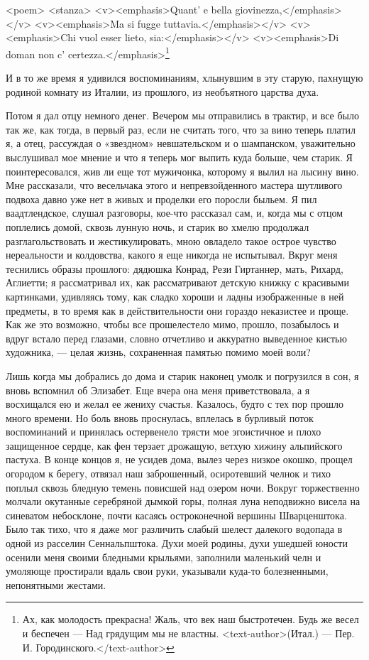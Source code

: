 <poem> <stanza> <v><emphasis>Quant’ e bella giovinezza,</emphasis></v>
<v><emphasis>Ma  si  fugge  tuttavia.</emphasis></v>  <v><emphasis>Chi
vuol  esser lieto,  sia:</emphasis></v> <v><emphasis>Di  doman non  c’
certezza.</emphasis>\footnote{Ах, как  молодость прекрасна!  Жаль, что
век наш  быстротечен. Будь же  весел и беспечен  — Над грядущим  мы не
властны. <text-author>(Итал.) --- Пер. И. Городинского.</text-author>}

И в  то же  время я  удивился воспоминаниям,  хлынувшим в  эту старую,
пахнущую  родиной  комнату  из  Италии, из  прошлого,  из  необъятного
царства духа.

Потом  я дал  отцу немного  денег. Вечером  мы отправились  в трактир,
и  все  было  так  же,  как  тогда, в  первый  раз,  если  не  считать
того, что  за вино  теперь платил  я, а  отец, рассуждая  о «звездном»
невшательском и о шампанском, уважительно  выслушивал мое мнение и что
я  теперь  мог выпить  куда  больше,  чем старик.  Я  поинтересовался,
жив  ли еще  тот  мужичонка,  которому я  вылил  на  лысину вино.  Мне
рассказали, что весельчака этого  и непревзойденного мастера шутливого
подвоха давно  уже нет в  живых и проделки  его поросли быльем.  Я пил
ваадтлендское, слушал разговоры, кое-что рассказал  сам, и, когда мы с
отцом поплелись домой, сквозь лунную ночь, и старик во хмелю продолжал
разглагольствовать  и  жестикулировать,  мною  овладело  такое  острое
чувство нереальности и колдовства, какого  я еще никогда не испытывал.
Вкруг меня теснились образы  прошлого: дядюшка Конрад, Рези Гиртаннер,
мать, Рихард,  Аглиетти; я рассматривал их,  как рассматривают детскую
книжку с  красивыми картинками,  удивляясь тому,  как сладко  хороши и
ладны изображенные в  ней предметы, в то время  как в действительности
они  гораздо  неказистее и  проще.  Как  же  это возможно,  чтобы  все
прошелестело мимо,  прошло, позабылось  и вдруг встало  перед глазами,
словно отчетливо  и аккуратно  выведенное кистью художника,  --- целая
жизнь, сохраненная памятью помимо моей воли?

Лишь когда мы добрались до дома  и старик наконец умолк и погрузился в
сон, я вновь вспомнил об  Элизабет. Еще вчера она меня приветствовала,
а я восхищался ею и желал ее жениху счастья. Казалось, будто с тех пор
прошло много  времени. Но боль  вновь проснулась, вплелась  в бурливый
поток воспоминаний  и принялась  остервенело трясти мое  эгоистичное и
плохо  защищенное  сердце, как  фен  терзает  дрожащую, ветхую  хижину
альпийского пастуха.  В конце  концов я, не  усидев дома,  вылез через
низкое  окошко, прощел  огородом  к берегу,  отвязал наш  заброшенный,
осиротевший  челнок  и  тихо  поплыл сквозь  бледную  темень  повисшей
над  озером ночи.  Вокруг  торжественно  молчали окутанные  серебряной
дымкой горы,  полная луна  неподвижно висела на  синеватом небосклоне,
почти  касаясь  остроконечной  вершины Шварценштока.  Было  так  тихо,
что  я даже  мог различить  слабый  шелест далекого  водопада в  одной
из  расселин  Сеннальпштока. Духи  моей  родины,  духи ушедшей  юности
осенили  меня своими  бледными  крыльями, заполнили  маленький челн  и
умоляюще простирали  вдаль свои руки, указывали  куда-то болезненными,
непонятными жестами.

